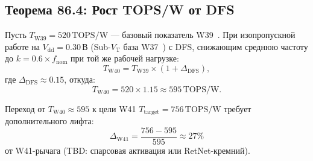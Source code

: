 \subsection{Теорема 86.4: Рост TOPS/W от DFS}
\label{subsec:thm-86-4}

\begin{theorem}
\label{thm:86-4}
Пусть $T_{\mathrm{W39}} = 520\,\text{TOPS/W}$ — базовый показатель W39~\cite{trios891}.
При изопропускной работе на $V_{\mathrm{dd}} = 0{.}30\,\text{В}$
(Sub-$V_{\mathrm{T}}$ база W37~\cite{t27660})
с DFS, снижающим среднюю частоту до $k = 0{.}6 \times f_{\mathrm{nom}}$
при той же рабочей нагрузке:
\begin{equation}
  T_{\mathrm{W40}} = T_{\mathrm{W39}} \times (1 + \Delta_{\mathrm{DFS}}),
  \label{eq:tops-w-lift}
\end{equation}
где $\Delta_{\mathrm{DFS}} \approx 0{.}15$, откуда:
\[
  T_{\mathrm{W40}} = 520 \times 1{.}15 \approx 595\,\text{TOPS/W}.
\]

Переход от $T_{\mathrm{W40}} \approx 595$ к цели W41 $T_{\mathrm{target}} = 756\,\text{TOPS/W}$
требует дополнительного лифта:
\[
  \Delta_{\mathrm{W41}} = \frac{756 - 595}{595} \approx 27\%
\]
от W41-рычага (TBD: спарсовая активация или RetNet-кремний).
\end{theorem}

